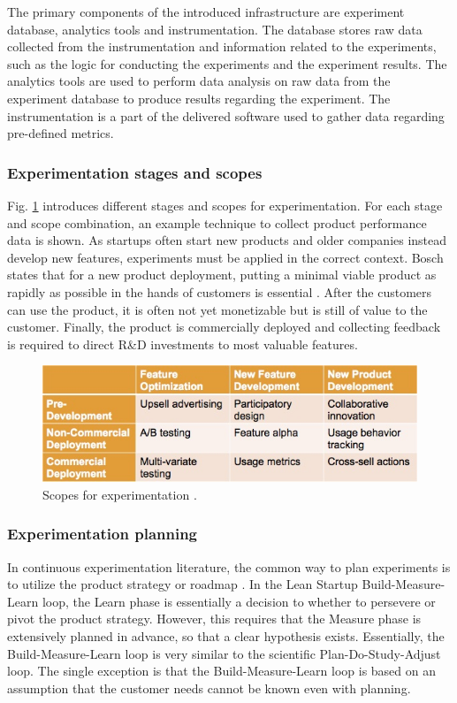 \documentclass[english, grading]{tktltiki2}
\theoremstyle{definition}
\theoremstyle{remark}
\begin{document}
The primary components of the introduced infrastructure are experiment database, analytics tools and instrumentation. The database stores raw data collected from the instrumentation and information related to the experiments, such as the logic for conducting the experiments and the experiment results. The analytics tools are used to perform data analysis on raw data from the experiment database to produce results regarding the experiment. The instrumentation is a part of the delivered software used to gather data regarding pre-defined metrics.  

\subsubsection{Experimentation stages and scopes}
Fig. \ref{fig6} introduces different stages and scopes for experimentation. For each stage and scope combination, an example technique to collect product performance data is shown. As startups often start new products and older companies instead develop new features, experiments must be applied in the correct context. Bosch states that for a new product deployment, putting a minimal viable product as rapidly as possible in the hands of customers is essential \cite{bosch2012building}. After the customers can use the product, it is often not yet monetizable but is still of value to the customer. Finally, the product is commercially deployed and collecting feedback is required to direct R\&D investments to most valuable features.
\begin{figure}[h]
	\centering
	\includegraphics[width=5.0in]{scopes.jpg}
	\caption{Scopes for experimentation \cite{bosch2012building}.}
	\label{fig6}
\end{figure}

\subsubsection{Experimentation planning}
In continuous experimentation literature, the common way to plan experiments is to utilize the product strategy or roadmap \cite{ries2011lean, fagerholm2012building}. In the Lean Startup Build-Measure-Learn loop, the Learn phase is essentially a decision to whether to persevere or pivot the product strategy. However, this requires that the Measure phase is extensively planned in advance, so that a clear hypothesis exists. Essentially, the Build-Measure-Learn loop is very similar to the scientific Plan-Do-Study-Adjust loop. The single exception is that the Build-Measure-Learn loop is based on an assumption that the customer needs cannot be known even with planning. 
\end{document}
